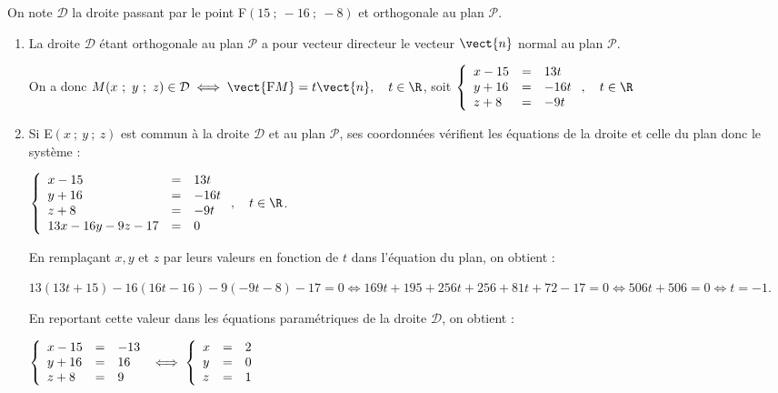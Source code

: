 On note $\mathcal{D}$ la droite passant par le point F$(15~;~-16~;~-8)$ et orthogonale au plan $\mathcal{P}$.
\begin{enumerate}[resume]
\item %
La droite $\mathcal{D}$ étant orthogonale au plan $\mathcal{P}$ a pour vecteur directeur le vecteur $\vect{n}$ normal au plan $\mathcal{P}$.

On a donc $M(x~;~y~;~z) \in \mathcal{D} \iff \vect{\text{F}M} = t \vect{n}, \quad t \in \R$, soit $\left\{\begin{array}{l c l}
x - 15&=&13t\\
y + 16&=&- 16t\\
z + 8&=&- 9t
\end{array}\right., \quad t \in \R$
\item %
Si E$(x~;~y~;~z)$ est commun à la droite $\mathcal{D}$ et au plan $\mathcal{P}$, ses coordonnées vérifient les équations de la droite et celle du plan donc le système :

$\left\{\begin{array}{l c l}
x - 15&=&13t\\
y + 16&=&- 16t\\
z + 8&=&- 9t\\
13x - 16y - 9z - 17 &=& 0
\end{array}\right., \quad t \in \R$.

En remplaçant $x, y$ et $z$ par leurs valeurs en fonction de $t$ dans l'équation du plan, on obtient :

$13(13t + 15) - 16(16t - 16)- 9(- 9t - 8) - 17 = 0 \iff 169t + 195 + 256t + 256 +81t + 72 - 17 = 0 \iff 506t + 506 = 0 \iff t = - 1$.

En reportant cette valeur dans les équations paramétriques de la droite $\mathcal{D}$, on obtient  :

$\left\{\begin{array}{l c l}
x - 15&=&-13 \\
y + 16&=&16\\
z + 8&=&9\\
\end{array}\right.\iff \left\{\begin{array}{l c l}
x &=&2 \\
y &=&0\\
z &=&1\\
\end{array}\right.$


\end{enumerate}
